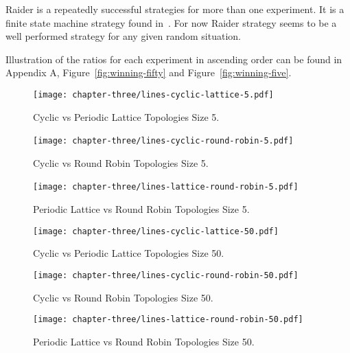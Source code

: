 Raider is a repeatedly successful strategies for more than one experiment.
It is a finite state machine strategy found in~\cite{DBLP:conf/foci/AshlockTA14}.
For now Raider strategy seems to be a well performed strategy for any
given random situation.

Illustration of the ratios for each experiment in ascending order can be found
in Appendix A, Figure~\ref{fig:winning-fifty} and Figure~\ref{fig:winning-five}.

\begin{figure}[H]
	\centering
	\texttt{[image: chapter-three/lines-cyclic-lattice-5.pdf]}
	\caption{Cyclic vs Periodic Lattice Topologies Size 5.}
	\label{fig:winning-rankings-five-c-l}
\end{figure}

\begin{figure}[H]
	\centering
	\texttt{[image: chapter-three/lines-cyclic-round-robin-5.pdf]}\
	\caption{Cyclic vs Round Robin Topologies Size 5.}
	\label{fig:winning-rankings-five-c-r}
\end{figure}

\begin{figure}[H]
	\centering
	\texttt{[image: chapter-three/lines-lattice-round-robin-5.pdf]}\
	\caption{Periodic Lattice vs Round
	Robin Topologies Size 5.}
	\label{fig:winning-rankings-five-l-r}
\end{figure}

\begin{figure}[H]
	\centering
	\texttt{[image: chapter-three/lines-cyclic-lattice-50.pdf]}
	\caption{Cyclic vs Periodic Lattice Topologies Size 50.}
	\label{fig:winning-rankings-fifty-c-l}
\end{figure}

\begin{figure}[H]
	\centering
	\texttt{[image: chapter-three/lines-cyclic-round-robin-50.pdf]}
	\caption{Cyclic vs Round Robin Topologies Size 50.}
	\label{fig:winning-rankings-fifty-c-r}
\end{figure}

\begin{figure}[H]
	\centering
	\texttt{[image: chapter-three/lines-lattice-round-robin-50.pdf]}
	\caption{Periodic Lattice vs Round Robin Topologies Size 50.}
	\label{fig:winning-rankings-fifty-l-r}
\end{figure}

